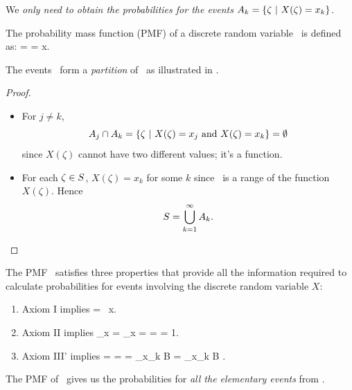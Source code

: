 	\item We \emph{only need to obtain the probabilities for the events
	$A_k = \{\zeta~|~X(\zeta)=x_k\}$}.


	\item The probability mass function (PMF)
	of a discrete random variable \X\ is defined as:
		 =  = 
		\mfor x\in\reals.
	\eeql

	\item The events \ form a \emph{partition} of \sspace\
	as illustrated in .
	\begin{proof}
	\begin{itemize}
		\item For $j\neq k$,
		\[
			A_j \cap A_k = \{\zeta~|~X(\zeta) = x_j \mbox{ and } X(\zeta) = x_k\}
			= \emptyset
		\]
		since $X(\zeta)$ cannot have two different values; it's a function.

		\item For each $\zeta\in S$, $X(\zeta)=x_k$ for some $k$ since \
		is a range of the function $X(\zeta)$.
		Hence
		\[
			S = \bigcup_{k=1}^{\infty} A_k.
		\]
	\end{itemize}
	\end{proof}

	\item
	The PMF \ satisfies three properties
	that provide all the information required to calculate probabilities
	for events involving the discrete random variable $X$:
	\begin{enumerate}
		\item Axiom I implies
			 =  ~\forall x.
		\eeql

		\item Axiom II implies
			\sum_{x\in\ssx} 
			= \sum_{x\in\ssx} 
			= \sumktoi {}
			= \pr{\sspace} = 1.
		\eeql

		\item Axiom III' implies
			= 
			= 
			= \sum_{x_k \in B} \pr{A_k}
			= \sum_{x_k \in B} .
		\eeql
	\end{enumerate}


	\item
	The PMF of \X\ gives us the probabilities for \emph{all the elementary events} from \ssx.

